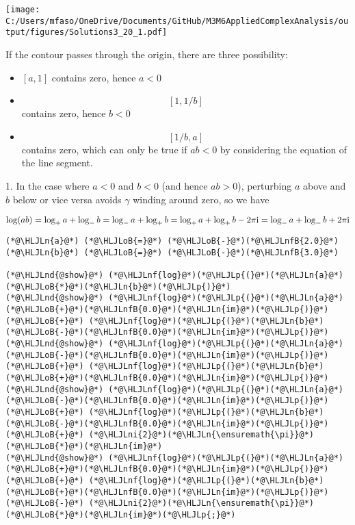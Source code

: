 \documentclass[12pt,a4paper]{article}
\newcommand{\HLJLn}[1]{#1}
\newcommand{\HLJLnd}[1]{\textcolor[RGB]{214,102,97}{#1}}
\newcommand{\HLJLnf}[1]{\textcolor[RGB]{66,102,213}{#1}}
\newcommand{\HLJLnfB}[1]{\textcolor[RGB]{59,151,46}{#1}}
\newcommand{\HLJLni}[1]{\textcolor[RGB]{59,151,46}{#1}}
\newcommand{\HLJLoB}[1]{\textcolor[RGB]{102,102,102}{\textbf{#1}}}
\newcommand{\HLJLp}[1]{#1}
\def\I{ {\rm i} }
\begin{document}
\texttt{[image: C:/Users/mfaso/OneDrive/Documents/GitHub/M3M6AppliedComplexAnalysis/output/figures/Solutions3\_20\_1.pdf]}

If the contour passes through the origin, there are three possibility:

\begin{itemize}
\item[1. ] $[a,1]$ contains zero, hence $a < 0$


\item[2. ] \[
[1,1/b]
\]
contains zero, hence $b < 0$


\item[3. ] \[
[1/b, a]
\]
contains zero, which can only be true if $a b < 0$ by considering the equation of the line segment.

\end{itemize}
1. In the case where $a < 0$ and $b < 0$ (and hence $a b > 0$), perturbing $a$ above  and $b$ below or vice versa avoids $\gamma$ winding around zero, so we have

\[
\log(a b) = \log_+ a + \log_- b = \log_- a + \log_+ b = \log_+ a + \log_+ b - 2 \pi \I = \log_- a + \log_- b + 2 \pi \I
\]

\begin{lstlisting}
(*@\HLJLn{a}@*) (*@\HLJLoB{=}@*) (*@\HLJLoB{-}@*)(*@\HLJLnfB{2.0}@*)
(*@\HLJLn{b}@*) (*@\HLJLoB{=}@*) (*@\HLJLoB{-}@*)(*@\HLJLnfB{3.0}@*)

(*@\HLJLnd{@show}@*) (*@\HLJLnf{log}@*)(*@\HLJLp{(}@*)(*@\HLJLn{a}@*)(*@\HLJLoB{*}@*)(*@\HLJLn{b}@*)(*@\HLJLp{)}@*)
(*@\HLJLnd{@show}@*) (*@\HLJLnf{log}@*)(*@\HLJLp{(}@*)(*@\HLJLn{a}@*)(*@\HLJLoB{+}@*)(*@\HLJLnfB{0.0}@*)(*@\HLJLn{im}@*)(*@\HLJLp{)}@*) (*@\HLJLoB{+}@*) (*@\HLJLnf{log}@*)(*@\HLJLp{(}@*)(*@\HLJLn{b}@*)(*@\HLJLoB{-}@*)(*@\HLJLnfB{0.0}@*)(*@\HLJLn{im}@*)(*@\HLJLp{)}@*)
(*@\HLJLnd{@show}@*) (*@\HLJLnf{log}@*)(*@\HLJLp{(}@*)(*@\HLJLn{a}@*)(*@\HLJLoB{-}@*)(*@\HLJLnfB{0.0}@*)(*@\HLJLn{im}@*)(*@\HLJLp{)}@*) (*@\HLJLoB{+}@*) (*@\HLJLnf{log}@*)(*@\HLJLp{(}@*)(*@\HLJLn{b}@*)(*@\HLJLoB{+}@*)(*@\HLJLnfB{0.0}@*)(*@\HLJLn{im}@*)(*@\HLJLp{)}@*)
(*@\HLJLnd{@show}@*) (*@\HLJLnf{log}@*)(*@\HLJLp{(}@*)(*@\HLJLn{a}@*)(*@\HLJLoB{-}@*)(*@\HLJLnfB{0.0}@*)(*@\HLJLn{im}@*)(*@\HLJLp{)}@*) (*@\HLJLoB{+}@*) (*@\HLJLnf{log}@*)(*@\HLJLp{(}@*)(*@\HLJLn{b}@*)(*@\HLJLoB{-}@*)(*@\HLJLnfB{0.0}@*)(*@\HLJLn{im}@*)(*@\HLJLp{)}@*) (*@\HLJLoB{+}@*) (*@\HLJLni{2}@*)(*@\HLJLn{\ensuremath{\pi}}@*)(*@\HLJLoB{*}@*)(*@\HLJLn{im}@*)
(*@\HLJLnd{@show}@*) (*@\HLJLnf{log}@*)(*@\HLJLp{(}@*)(*@\HLJLn{a}@*)(*@\HLJLoB{+}@*)(*@\HLJLnfB{0.0}@*)(*@\HLJLn{im}@*)(*@\HLJLp{)}@*) (*@\HLJLoB{+}@*) (*@\HLJLnf{log}@*)(*@\HLJLp{(}@*)(*@\HLJLn{b}@*)(*@\HLJLoB{+}@*)(*@\HLJLnfB{0.0}@*)(*@\HLJLn{im}@*)(*@\HLJLp{)}@*) (*@\HLJLoB{-}@*) (*@\HLJLni{2}@*)(*@\HLJLn{\ensuremath{\pi}}@*)(*@\HLJLoB{*}@*)(*@\HLJLn{im}@*)(*@\HLJLp{;}@*)
\end{lstlisting}
\end{document}
